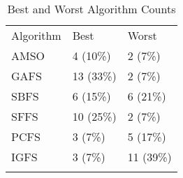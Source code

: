 \begin{table}
\caption{Best and Worst Algorithm Counts}
\label{tbl:best:worst:count}
\begin{tabular}{lll}
\noalign{\smallskip}\hline\noalign{\smallskip}
Algorithm&Best&Worst\\
\noalign{\smallskip}\hline
AMSO&4 (10\%)&2 (7\%)\\
GAFS&13 (33\%)&2 (7\%)\\
SBFS&6 (15\%)&6 (21\%)\\
SFFS&10 (25\%)&2 (7\%)\\
PCFS&3 (7\%)&5 (17\%)\\
IGFS&3 (7\%)&11 (39\%)\\
\noalign{\smallskip}\hline
\end{tabular}
\end{table}
